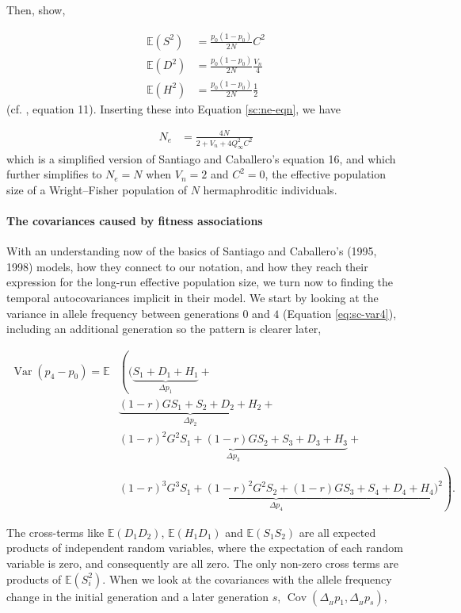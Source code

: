 \documentclass[11pt]{article}
\newcommand{\nnn}{\nonumber}
\newcommand{\E}{\mathbb{E}}
\DeclareMathOperator{\var}{Var}
\DeclareMathOperator{\cov}{Cov}
\begin{document}
Then, \textcite{Santiago1995-hx} show,

\begin{align}
  \E(S^2) &= \frac{p_0(1-p_0)}{2N} C^2 \\
  \E(D^2) &= \frac{p_0(1-p_0)}{2N} \frac{V_n}{4} \\
  \E(H^2) &= \frac{p_0(1-p_0)}{2N} \frac{1}{2}
\end{align}
%
(cf. \cite{Santiago1995-hx}, equation 11). Inserting these into Equation
\eqref{sc:ne-eqn}, we have

\begin{align}
  N_e &= \frac{4N}{2 + V_n + 4 Q_\infty^2 C^2}
\end{align}
%
which is a simplified version of Santiago and Caballero's equation 16, and
which further simplifies to $N_e = N$ when $V_n = 2$ and $C^2 = 0$, the
effective population size of a Wright--Fisher population of $N$ hermaphroditic
individuals.


\paragraph{The covariances caused by fitness associations}

With an understanding now of the basics of Santiago and Caballero's (1995,
1998) models, how they connect to our notation, and how they reach their
expression for the long-run effective population size, we turn now to finding
the temporal autocovariances implicit in their model. We start by looking at
the variance in allele frequency between generations $0$ and $4$ (Equation
\eqref{eq:sc-var4}), including an additional generation so the pattern is
clearer later,

\begin{align}
  \var(p_4 - p_0) = \E & \left( \bigg( \underbrace{S_1 + D_1 + H_1}_{\Delta p_1} + \right. \nonumber \\
                             & \underbrace{ (1-r) G S_1 + S_2 + D_2 + H_2}_{\Delta p_2} + \nonumber \\
                             &  \underbrace{ (1-r)^2 G^2 S_1 + (1-r) G S_2 + S_3 + D_3 + H_3}_{\Delta p_3} + \nonumber \\
                             &  \left. \underbrace{ (1-r)^3 G^3 S_1 + (1-r)^2 G^2 S_2 + (1-r) G S_3 + S_4 + D_4 + H_4}_{\Delta p_4} \bigg)^2 \right). \nnn 
\end{align}

The cross-terms like $\E(D_1 D_2)$, $\E(H_1 D_1)$ and $\E(S_1 S_2)$ are all expected
products of independent random variables, where the expectation of each random
variable is zero, and consequently are all zero. The only non-zero cross terms
are products of $\E(S_i^2)$. When we look at the covariances with the allele
frequency change in the initial generation and a later generation $s$,
$\cov(\Delta_{_H} p_1, \Delta_{_H} p_s)$,
\end{document}
